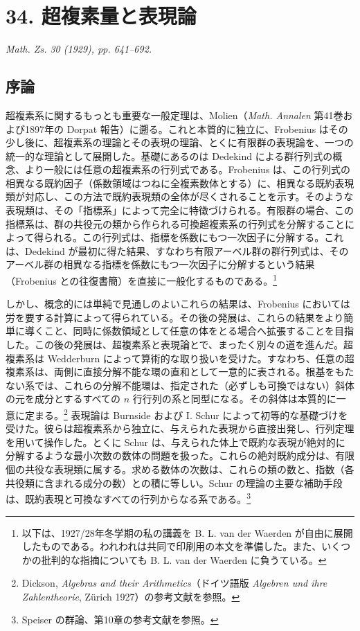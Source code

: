 \documentclass[11pt]{article}
\begin{document}
\setcounter{footnote}{0}

\section*{34. 超複素量と表現論}
\emph{Math. Zs. 30 (1929), pp. 641--692.}

\subsection*{序論}

超複素系に関するもっとも重要な一般定理は、Molien（\emph{Math. Annalen} 第41巻および1897年の Dorpat 報告）に遡る。これと本質的に独立に、Frobenius はその少し後に、超複素系の理論とその表現の理論、とくに有限群の表現論を、一つの統一的な理論として展開した。基礎にあるのは Dedekind による群行列式の概念、より一般には任意の超複素系の行列式である。Frobenius は、この行列式の相異なる既約因子（係数領域はつねに全複素数体とする）に、相異なる既約表現類が対応し、この方法で既約表現類の全体が尽くされることを示す。そのような表現類は、その「指標系」によって完全に特徴づけられる。有限群の場合、この指標系は、群の共役元の類から作られる可換超複素系の行列式を分解することによって得られる。この行列式は、指標を係数にもつ一次因子に分解する。これは、Dedekind が最初に得た結果、すなわち有限アーベル群の群行列式は、そのアーベル群の相異なる指標を係数にもつ一次因子に分解するという結果（Frobenius との往復書簡）を直接に一般化するものである。\footnote{以下は、1927/28年冬学期の私の講義を B. L. van der Waerden が自由に展開したものである。われわれは共同で印刷用の本文を準備した。また、いくつかの批判的な指摘についても B. L. van der Waerden に負うている。}

しかし、概念的には単純で見通しのよいこれらの結果は、Frobenius においては労を要する計算によって得られている。その後の発展は、これらの結果をより簡単に導くこと、同時に係数領域として任意の体をとる場合へ拡張することを目指した。この後の発展は、超複素系と表現論とで、まったく別々の道を進んだ。超複素系は Wedderburn によって算術的な取り扱いを受けた。すなわち、任意の超複素系は、両側に直接分解不能な環の直和として一意的に表される。根基をもたない系では、これらの分解不能環は、指定された（必ずしも可換ではない）斜体の元を成分とするすべての $n$ 行行列の系と同型になる。その斜体は本質的に一意に定まる。\footnote{Dickson, \emph{Algebras and their Arithmetics}（ドイツ語版 \emph{Algebren und ihre Zahlentheorie}, Zürich 1927）の参考文献を参照。} 表現論は Burnside および I. Schur によって初等的な基礎づけを受けた。彼らは超複素系から独立に、与えられた表現から直接出発し、行列定理を用いて操作した。とくに Schur は、与えられた体上で既約な表現が絶対的に分解するような最小次数の数体の問題を扱った。これらの絶対既約成分は、有限個の共役な表現類に属する。求める数体の次数は、これらの類の数と、指数（各共役類に含まれる成分の数）との積に等しい。Schur の理論の主要な補助手段は、既約表現と可換なすべての行列からなる系である。\footnote{Speiser の群論、第10章の参考文献を参照。}
\end{document}
